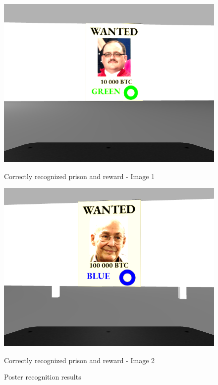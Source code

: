 \documentclass{article}
\begin{document}
\begin{figure}[htbp]
  \centering
  \begin{minipage}[b]{0.45\textwidth}
    \centering
    \includegraphics[width=\textwidth]{images/poster1.png}
    \caption{Correctly recognized prison and reward - Image 1}
    \label{fig:poster1}
  \end{minipage}%
    \hfill
  \begin{minipage}[b]{0.45\textwidth}
    \centering
    \includegraphics[width=\textwidth]{images/poster2.png}
    \caption{Correctly recognized prison and reward - Image 2}
    \label{fig:poster2}
  \end{minipage}
  \caption{Poster recognition results}
  \label{fig:posters}
\end{figure}
\end{document}
